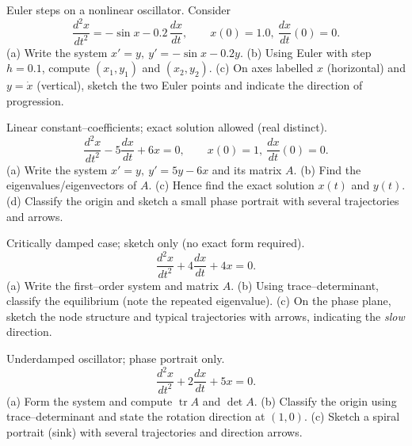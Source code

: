 \documentclass[11pt]{article}
\def\textbf#1{#1}%
\newcounter{question}
\begin{document}
\begin{question}
\textbf{Euler steps on a nonlinear oscillator.}
Consider
\[
\frac{d^{2}x}{dt^{2}}=-\sin x-0.2\,\frac{dx}{dt},\qquad x(0)=1.0,\ \frac{dx}{dt}(0)=0.
\]
(a) Write the system \(x'=y,\ y'=-\sin x-0.2y\).  
(b) Using Euler with step \(h=0.1\), compute \((x_1,y_1)\) and \((x_2,y_2)\).  
(c) On axes labelled \(x\) (horizontal) and \(y=\dot x\) (vertical), sketch the two Euler points and indicate the direction of progression.
\begin{center}
\end{center}
\end{question}

\begin{question}
\textbf{Linear constant–coefficients; exact solution allowed (real distinct).}
\[
\frac{d^{2}x}{dt^{2}}-5\frac{dx}{dt}+6x=0,\qquad x(0)=1,\ \frac{dx}{dt}(0)=0.
\]
(a) Write the system \(x'=y,\ y'=5y-6x\) and its matrix \(A\).  
(b) Find the eigenvalues/eigenvectors of \(A\).  
(c) Hence find the exact solution \(x(t)\) and \(y(t)\).  
(d) Classify the origin and sketch a small phase portrait with several trajectories and arrows.
\end{question}

\begin{question}
\textbf{Critically damped case; sketch only (no exact form required).}
\[
\frac{d^{2}x}{dt^{2}}+4\frac{dx}{dt}+4x=0.
\]
(a) Write the first–order system and matrix \(A\).  
(b) Using trace–determinant, classify the equilibrium (note the repeated eigenvalue).  
(c) On the phase plane, sketch the node structure and typical trajectories with arrows, indicating the \emph{slow} direction.
\begin{center}
\end{center}
\end{question}

\begin{question}
\textbf{Underdamped oscillator; phase portrait only.}
\[
\frac{d^{2}x}{dt^{2}}+2\frac{dx}{dt}+5x=0.
\]
(a) Form the system and compute \(\operatorname{tr}A\) and \(\det A\).  
(b) Classify the origin using trace–determinant and state the rotation direction at \((1,0)\).  
(c) Sketch a spiral portrait (sink) with several trajectories and direction arrows.
\end{question}
\end{document}
